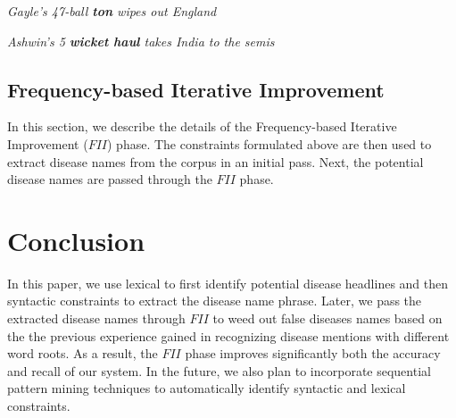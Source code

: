 \documentclass{article}
\begin{document}
\textit{Gayle's 47-ball \textbf{ton} wipes out England }

\textit{Ashwin's 5 \textbf{wicket haul} takes India to the semis}


\subsection{Frequency-based Iterative Improvement}

In this section, we describe the details of the Frequency-based Iterative Improvement ($FII$) phase. 
The constraints formulated above are then used to extract disease names from the corpus in an initial pass. Next, the potential disease names are passed through the $FII$ phase.

\section{Conclusion}
In this paper, we use lexical to first identify potential disease headlines and then syntactic constraints to extract the disease name phrase. Later, we pass the extracted disease names through $FII$ to weed out false diseases names based on the the previous experience gained in recognizing disease mentions with different word roots. As a result, the $FII$ phase improves significantly both the accuracy and recall of our system. In the future, we also plan to incorporate sequential pattern mining techniques to automatically identify syntactic and lexical constraints.  


\end{document}
